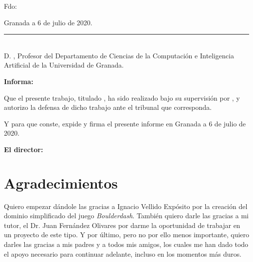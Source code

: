 \vspace{6cm}

\noindent Fdo: \autor

\vspace{2cm}

\begin{flushright}
Granada a 6 de julio de 2020.
\end{flushright}


\cleardoublepage
\thispagestyle{empty}

\noindent\rule[-1ex]{\textwidth}{2pt}\\[4.5ex]

D. \textbf{\director}, Profesor del Departamento de Ciencias de la Computación e Inteligencia Artificial
de la Universidad de Granada.


\vspace{0.5cm}

\textbf{Informa:}

\vspace{0.5cm}

Que el presente trabajo, titulado \textit{\textbf{\titulo}},
ha sido realizado bajo su supervisión por \textbf{\autor}, y autorizo la defensa de dicho trabajo ante el tribunal
que corresponda.

\vspace{0.5cm}

Y para que conste, expide y firma el presente informe en Granada a 6 de julio de 2020.

\vspace{1cm}

\textbf{El director:}

\vspace{5cm}

\noindent \textbf{\director{} }

\chapter*{Agradecimientos}
\thispagestyle{empty}

       \vspace{1cm}


Quiero empezar dándole las gracias a Ignacio Vellido Expósito por la creación del dominio
simplificado del juego \textit{Boulderdash}. También quiero darle las gracias a mi tutor,
el Dr. Juan Fernández Olivares por darme la oportunidad de trabajar en un proyecto de este tipo.
Y por último, pero no por ello menos importante, quiero darles las gracias a mis padres y a todos
mis amigos, los cuales me han dado todo el apoyo necesario para continuar adelante, incluso
en los momentos más duros.
